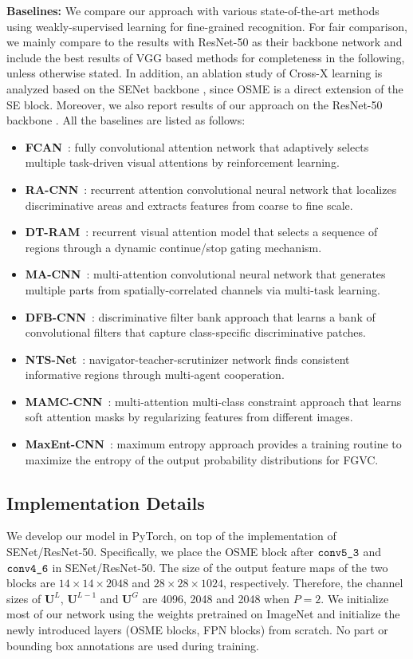 \documentclass[10pt,twocolumn,letterpaper]{article}
\begin{document}
\textbf{Baselines:} We compare our approach with various state-of-the-art methods using weakly-supervised learning for fine-grained recognition. For fair comparison, we mainly compare to the results with ResNet-50 as their backbone network and include the best results of VGG based methods for completeness in the following, unless otherwise stated. 
In addition, an ablation study of Cross-X learning is analyzed based on the SENet backbone \cite{senet17cvpr}, since OSME is a direct extension of the SE block. Moreover, we also report results of our approach on the ResNet-50 backbone \cite{resnet16kaiming}.
All the baselines are listed as follows:
\begin{itemize}
\itemsep0em 
\item \textbf{FCAN}~\cite{fcan@lin}: fully convolutional attention network that adaptively selects multiple task-driven visual attentions by reinforcement learning.
\item \textbf{RA-CNN}~\cite{racnn@mei}: recurrent attention  convolutional neural network that localizes discriminative areas and extracts features from coarse to fine scale.
\item \textbf{DT-RAM}~\cite{ram@arxiv}: recurrent visual attention model that selects a sequence of regions through a dynamic continue/stop gating mechanism. 
\item \textbf{MA-CNN}~\cite{macnn@mei}: multi-attention convolutional neural network that generates multiple parts from spatially-correlated channels via multi-task learning.
\item \textbf{DFB-CNN}~\cite{dfbnet18larry}: discriminative filter bank approach that learns a bank of convolutional filters that capture class-specific discriminative patches.
\item \textbf{NTS-Net}~\cite{ntscnn@eccv}: navigator-teacher-scrutinizer network finds consistent informative regions through multi-agent cooperation. 
\item \textbf{MAMC-CNN}~\cite{mamc18eccv}: multi-attention multi-class constraint approach that learns soft attention masks by regularizing features from different images.
\item \textbf{MaxEnt-CNN}~\cite{maxent@nips}: maximum entropy approach provides a training routine to maximize the entropy of the output probability distributions for FGVC.
\end{itemize}


\subsection{Implementation Details}
\label{sec:iplt}
We develop our model in PyTorch, on top of the implementation of SENet/ResNet-50.
Specifically, we place the OSME block after $\verb'conv5_3'$ and $\verb'conv4_6'$ in SENet/ResNet-50.
The size of the output feature maps of the two blocks are $14\times 14 \times 2048$ and $28\times 28 \times 1024$, respectively.
Therefore, the channel sizes of $\mathbf{U}^L$, $\mathbf{U}^{L-1}$ and $\mathbf{U}^G$ are 4096, 2048 and 2048 when $P=2$. 
We initialize most of our network using the weights pretrained on ImageNet and initialize the newly introduced layers (OSME blocks, FPN blocks) from scratch.
No part or bounding box annotations are used during training.
\end{document}
